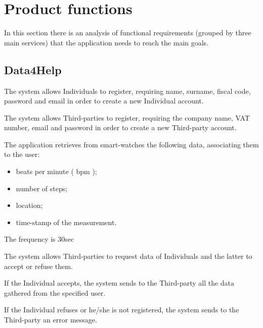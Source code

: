 \section{Product functions}

In this section there is an analysis of functional requirements (grouped by three main services) that the application needs to reach the main goals. 



\subsection{Data4Help}
\begin{enumerate}[label={[}R1.\arabic*{]}]

    \item The system allows Individuals to register, requiring name, surname, fiscal code, password and email in order to create a new Individual account.

    \item The system allows Third-parties to register, requiring the company name, VAT number, email and password in order to create a new Third-party account.
    
    \item The application retrieves from smart-watches the following data, associating them to the user: 
    \begin{itemize}
        \item beats per minute ( bpm );
        \item number of steps;
        \item location;
        \item time-stamp of the measurement.
    \end{itemize}
    
    \item The frequency is 30sec %
    
    \item The system allows Third-parties to request data of Individuals and the latter to accept or refuse them. 
    \begin{enumerate}[label={[}R1.\arabic{enumi}.\arabic*{]}, leftmargin=*]
        \item If the Individual accepts, the system sends to the Third-party all the data gathered from the specified user.
    
        \item If the Individual refuses or he/she is not registered, the system sends to the Third-party an error message.
    \end{enumerate}
    

\end{enumerate}
